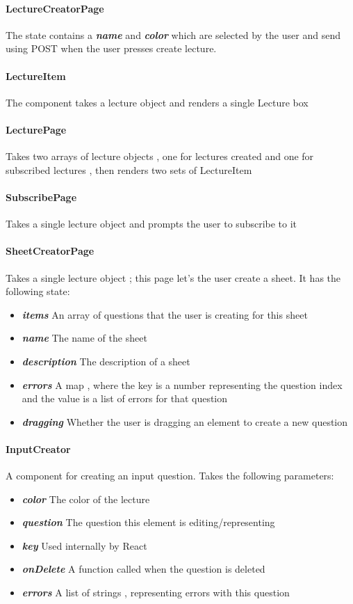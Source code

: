 \paragraph{LectureCreatorPage} The state contains a \textit{\textbf{name}} and \textit{\textbf{color}} which are selected by the user and send using POST when the user presses create lecture.
\paragraph{LectureItem} The component takes a lecture object and renders a single Lecture box
\paragraph{LecturePage} Takes two arrays of lecture objects , one for lectures created and one for subscribed lectures , then renders two sets of LectureItem
\paragraph{SubscribePage} Takes a single lecture object and prompts the user to subscribe to it
\paragraph{SheetCreatorPage} Takes a single lecture object ; this page let's the user create a sheet. It has the following state:
\begin{itemize}
	\item \textit{\textbf{items}} An array of questions that the user is creating for this sheet
	\item \textit{\textbf{name}} The name of the sheet
	\item \textit{\textbf{description}} The description of a sheet
	\item \textit{\textbf{errors}} A map , where the key is a number representing the question index and the value is a list of errors for that question
	\item \textit{\textbf{dragging}} Whether the user is dragging an element to create a new question
\end{itemize}
\paragraph{InputCreator} A component for creating an input question. Takes the following parameters:
\begin{itemize}
	\item \textit{\textbf{color}} The color of the lecture
	\item \textit{\textbf{question}} The question this element is editing/representing
	\item \textit{\textbf{key}} Used internally by React
	\item \textit{\textbf{onDelete}} A function called when the question is deleted
	\item \textit{\textbf{errors}} A list of strings , representing errors with this question
\end{itemize}
